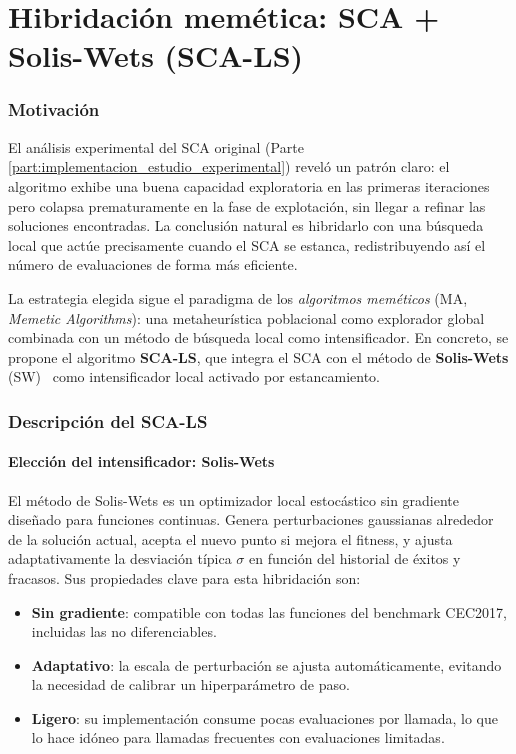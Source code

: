 \documentclass[12pt,a4paper]{article}
\begin{document}
\part{Hibridación memética: SCA + Solis-Wets (SCA-LS)}\label{part:hibridacion_memetica}
 
\section{Motivación}
 
El análisis experimental del SCA original (Parte \ref{part:implementacion_estudio_experimental}) reveló un patrón claro: el algoritmo exhibe una buena capacidad exploratoria en las primeras iteraciones pero colapsa prematuramente en la fase de explotación, sin llegar a refinar las soluciones encontradas. La conclusión natural es hibridarlo con una búsqueda local que actúe precisamente cuando el SCA se estanca, redistribuyendo así el número de evaluaciones de forma más eficiente.
 
La estrategia elegida sigue el paradigma de los \textit{algoritmos meméticos} (MA, \textit{Memetic Algorithms}): una metaheurística poblacional como explorador global combinada con un método de búsqueda local como intensificador. En concreto, se propone el algoritmo \textbf{SCA-LS}, que integra el SCA con el método de \textbf{Solis-Wets} (SW)~\cite{solis1981} como intensificador local activado por estancamiento.
 
\section{Descripción del SCA-LS}
 
\subsection{Elección del intensificador: Solis-Wets}
 
El método de Solis-Wets es un optimizador local estocástico sin gradiente diseñado para funciones continuas. Genera perturbaciones gaussianas alrededor de la solución actual, acepta el nuevo punto si mejora el fitness, y ajusta adaptativamente la desviación típica $\sigma$ en función del historial de éxitos y fracasos. Sus propiedades clave para esta hibridación son:
 
\begin{itemize}
  \item \textbf{Sin gradiente}: compatible con todas las funciones del benchmark CEC2017, incluidas las no diferenciables.
  \item \textbf{Adaptativo}: la escala de perturbación se ajusta automáticamente, evitando la necesidad de calibrar un hiperparámetro de paso.
  \item \textbf{Ligero}: su implementación consume pocas evaluaciones por llamada, lo que lo hace idóneo para llamadas frecuentes con evaluaciones limitadas.
\end{itemize}
 
\end{document}

